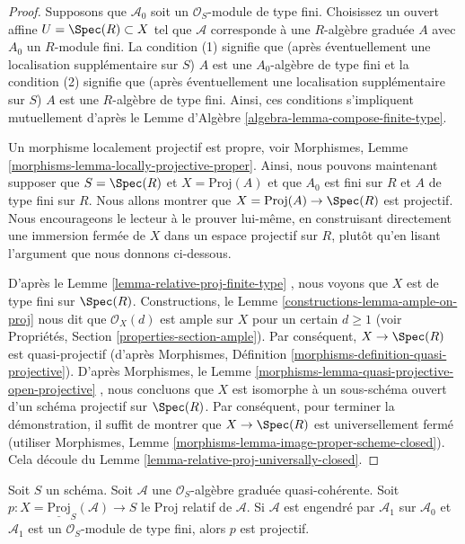 \begin{proof}
Supposons que  $\mathcal{A}_0$  soit un  $\mathcal{O}_S$-module de type fini. Choisissez un
ouvert affine  $U = \Spec(R) \subset X$  tel que  $\mathcal{A}$  corresponde à une
 $R$-algèbre graduée  $A$  avec  $A_0$  un  $R$-module
fini. La condition (1) signifie que (après éventuellement une localisation
supplémentaire sur  $S$)  $A$  est une  $A_0$-algèbre de type
fini et la condition (2) signifie que (après éventuellement une localisation
supplémentaire sur  $S$)  $A$  est une  $R$-algèbre de type
fini. Ainsi, ces conditions s'impliquent mutuellement d'après le Lemme d'Algèbre
 \ref{algebra-lemma-compose-finite-type}.

\medskip\noindent
Un morphisme localement projectif est propre, voir Morphismes, Lemme  \ref{morphisms-lemma-locally-projective-proper}.
Ainsi, nous pouvons maintenant supposer que  $S = \Spec(R)$  et  $X = \text{Proj}(A)$  et que
 $A_0$  est fini sur  $R$  et  $A$  de type fini sur
 $R$. Nous allons montrer que  $X = \text{Proj}(A) \to \Spec(R)$  est projectif. Nous
encourageons le lecteur à le prouver lui-même, en construisant directement une
immersion fermée de  $X$  dans un espace projectif sur  $R$, plutôt
qu'en lisant l'argument que nous donnons ci-dessous.

\medskip\noindent
D'après le Lemme  \ref{lemma-relative-proj-finite-type} , nous voyons que  $X$  est de type fini sur
 $\Spec(R)$. Constructions, le Lemme  \ref{constructions-lemma-ample-on-proj}  nous dit que  $\mathcal{O}_X(d)$  est
ample sur  $X$  pour un certain  $d \geq 1$  (voir Propriétés, Section
 \ref{properties-section-ample}). Par conséquent,  $X \to \Spec(R)$  est quasi-projectif (d'après
Morphismes, Définition  \ref{morphisms-definition-quasi-projective}). D'après Morphismes, le Lemme  \ref{morphisms-lemma-quasi-projective-open-projective} ,
nous concluons que  $X$  est isomorphe à un sous-schéma ouvert d'un schéma
projectif sur  $\Spec(R)$. Par conséquent, pour terminer la démonstration, il
suffit de montrer que  $X \to \Spec(R)$  est universellement fermé (utiliser Morphismes,
Lemme  \ref{morphisms-lemma-image-proper-scheme-closed}). Cela découle du Lemme  \ref{lemma-relative-proj-universally-closed}.
\end{proof}

\begin{lemma}
\label{lemma-relative-proj-projective}
Soit  $S$  un schéma. Soit  $\mathcal{A}$  une  $\mathcal{O}_S$-algèbre graduée
quasi-cohérente. Soit  $p : X = \underline{\text{Proj}}_S(\mathcal{A}) \to S$  le Proj relatif de  $\mathcal{A}$. Si
 $\mathcal{A}$  est engendré par  $\mathcal{A}_1$  sur  $\mathcal{A}_0$  et  $\mathcal{A}_1$  est un
 $\mathcal{O}_S$-module de type fini, alors  $p$  est projectif.
\end{lemma}

